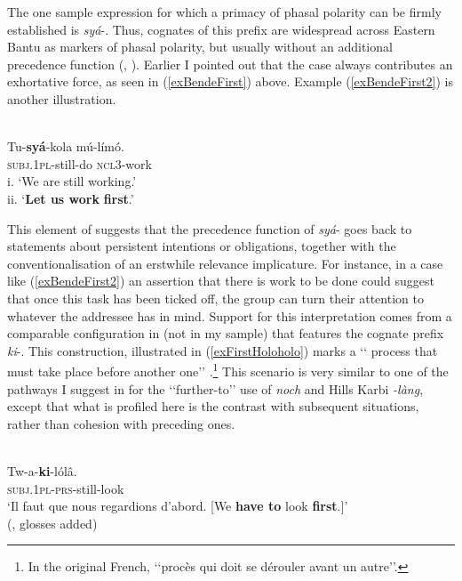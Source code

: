 The one sample expression for which a primacy of phasal polarity can be firmly established is  \mbox{\textit{syá}-}. Thus, cognates of this prefix are widespread across Eastern Bantu as markers of phasal polarity, but usually without an additional precedence function (\cite{Abe2015}, \citeyear{Abe2016}). Earlier I pointed out that the  case always contributes an exhortative force, as seen in (\ref{exBendeFirst}) above. Example (\ref{exBendeFirst2}) is another illustration.

\begin{exe}
	\ex {} \label{exBendeFirst2}\\
	\gll Tu-\textbf{syá}-kola mú-límó.\\
	\textsc{subj}.1\textsc{pl}-still-do \textsc{ncl}3-work\\
	\glt i.\phantom{i} \lq We are still working.'\\
	ii. \lq \textbf{Let us work} \textbf{first}.' \parencite[29]{Abe2015}
\end{exe}

This element of  suggests that the precedence function of  \mbox{\textit{syá}-} goes back to statements about persistent intentions or obligations, together with the conventionalisation of an erstwhile relevance implicature. For instance, in a case like (\ref{exBendeFirst2}) an assertion that there is work to be done could suggest that once this task has been ticked off, the group can turn their attention to whatever the addressee has in mind. Support for this interpretation comes from a comparable configuration in  (not in my sample) that features the cognate prefix \textit{ki}-. This construction, illustrated in (\ref{exFirstHoloholo}) marks a \lq\lq 
process that must take place before another one\rq\rq{ }\parencite[104]{Coupez1955}.\footnote{In the original French, \lq\lq procès qui doit se dérouler avant un autre\rq\rq{}.} This scenario is very similar to one of the pathways I suggest in  for the \lq\lq{}further-to\rq\rq{ }use of  \textit{noch} and Hills Karbi \textit{-\textit{làng}}, except that what is profiled here is the contrast with subsequent situations, rather than cohesion with preceding ones.

\begin{exe}
	\ex {}\label{exFirstHoloholo}\\
	\gll Tw-a-\textbf{ki}-lólâ.\\
	\textsc{subj}.1\textsc{pl}-\textsc{prs}-still-look\\
	\glt \lq Il faut que nous regardions d\rq{}abord. [We \textbf{have to} look \textbf{first}.]\rq{}
	\\(\cite[103]{Coupez1955}, glosses added)
\end{exe}

